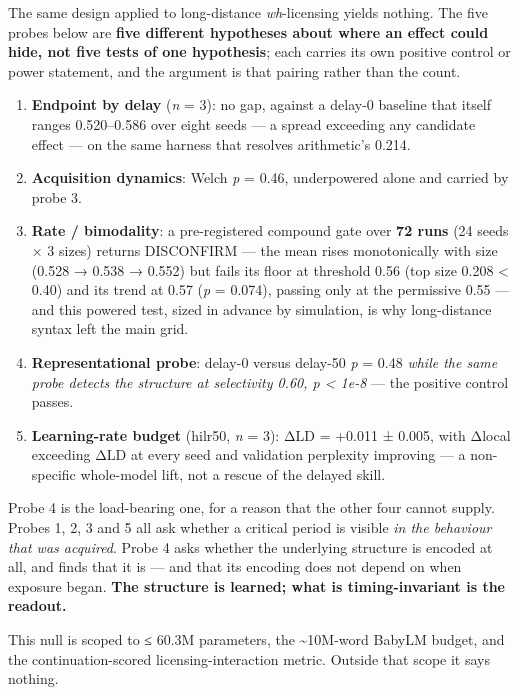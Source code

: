 \documentclass{article}
\providecommand{\tightlist}{\setlength{\itemsep}{0pt}\setlength{\parskip}{0pt}}
\begin{document}
The same design applied to long-distance \emph{wh}-licensing yields nothing. The five probes
below are \textbf{five different hypotheses about where an effect could hide, not five tests of
one hypothesis}; each carries its own positive control or power statement, and the argument
is that pairing rather than the count.

\begin{enumerate}
\def\labelenumi{\arabic{enumi}.}
\tightlist
\item
  \textbf{Endpoint by delay} (\emph{n} = 3): no gap, against a delay-0 baseline that itself ranges
  0.520--0.586 over eight seeds --- a spread exceeding any candidate effect --- on the same
  harness that resolves arithmetic's 0.214.
\item
  \textbf{Acquisition dynamics}: Welch \emph{p} = 0.46, underpowered alone and carried by probe 3.
\item
  \textbf{Rate / bimodality}: a pre-registered compound gate over \textbf{72 runs} (24 seeds × 3
  sizes) returns DISCONFIRM --- the mean rises monotonically with size (0.528 → 0.538 →
  0.552) but fails its floor at threshold 0.56 (top size 0.208 \textless{} 0.40) and its trend at
  0.57 (\emph{p} = 0.074), passing only at the permissive 0.55 --- and this powered test, sized in
  advance by simulation, is why long-distance syntax left the main grid.
\item
  \textbf{Representational probe}: delay-0 versus delay-50 \emph{p} = 0.48 \emph{while the same probe
  detects the structure at selectivity 0.60, p \textless{} 1e-8} --- the positive control passes.
\item
  \textbf{Learning-rate budget} (hilr50, \emph{n} = 3): ΔLD = +0.011 ± 0.005, with Δlocal exceeding
  ΔLD at every seed and validation perplexity improving --- a non-specific whole-model lift,
  not a rescue of the delayed skill.
\end{enumerate}

Probe 4 is the load-bearing one, for a reason that the other four cannot supply. Probes 1,
2, 3 and 5 all ask whether a critical period is visible \emph{in the behaviour that was
acquired}. Probe 4 asks whether the underlying structure is encoded at all, and finds that
it is --- and that its encoding does not depend on when exposure began. \textbf{The structure is
learned; what is timing-invariant is the readout.}

This null is scoped to ≤ 60.3M parameters, the \textasciitilde10M-word BabyLM budget, and the
continuation-scored licensing-interaction metric. Outside that scope it says nothing.
\end{document}
